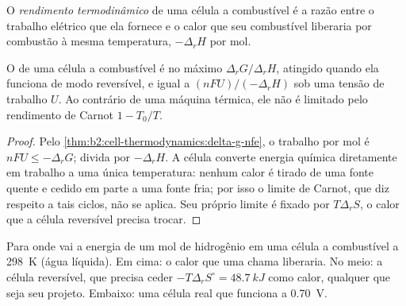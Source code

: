 \begin{definition}\label{def:b2:cell-thermodynamics:efficiency}
O \emph{rendimento termodinâmico} de uma célula a
combustível é a razão entre o trabalho elétrico que ela fornece e o calor que
seu combustível liberaria por combustão à mesma temperatura, $-\Delta_r H$ por mol.
\end{definition}

\begin{proposition}\label{prop:b2:cell-thermodynamics:efficiency}
O  de uma célula a combustível é no máximo $\Delta_r G/\Delta_r H$,
atingido quando ela funciona de modo reversível, e igual a $(nFU)/(-\Delta_r H)$
sob uma tensão de trabalho $U$. Ao contrário de uma máquina térmica, ele não é
limitado pelo rendimento de Carnot $1 - T_0/T$.
\end{proposition}

\begin{proof}
Pelo \cref{thm:b2:cell-thermodynamics:delta-g-nfe}, o trabalho por mol é $nFU \leq
-\Delta_r G$; divida por $-\Delta_r H$. A célula converte energia química
diretamente em trabalho a uma única temperatura: nenhum calor é tirado de uma
fonte quente e cedido em parte a uma fonte fria; por isso o limite de Carnot,
que diz respeito a tais ciclos, não se aplica. Seu próprio limite é fixado por
$T\Delta_r S$, o calor que a célula reversível precisa trocar.
\end{proof}

\begin{omfigure}

{\small Para onde vai a energia de um mol de hidrogênio em uma célula a
combustível a \qty{298}{K} (água líquida). Em cima: o calor que uma chama
liberaria. No meio: a célula reversível, que precisa ceder
$-T\Delta_r S^\circ = \qty{48.7}{kJ}$ como calor, qualquer que seja seu
projeto. Embaixo: uma célula real que funciona a \qty{0.70}{V}.}
\end{omfigure}

